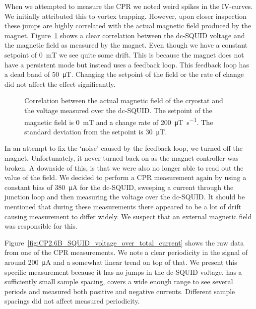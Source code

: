 When we attempted to measure the CPR we noted weird spikes in the IV-curves. We initially attributed this to vortex trapping. However, upon closer inspection these jumps are highly correlated with the actual magnetic field produced by the magnet. Figure~\ref{fig:CP2.6B_PPMS_magnetic_field_drift} shows a clear correlation between the dc-SQUID voltage and the magnetic field as measured by the magnet. Even though we have a constant setpoint of \qty{0}{\milli\tesla} we see quite some drift. This is because the magnet does not have a persistent mode but instead uses a feedback loop. This feedback loop has a dead band of \qty{50}{\micro\tesla}. Changing the setpoint of the field or the rate of change did not affect the effect significantly.

\begin{figure}[ht!]
	\centering
	
	\caption{Correlation between the actual magnetic field of the cryostat and the voltage measured over the dc-SQUID. The setpoint of the magnetic field is \qty{0}{\milli\tesla} and a change rate of \qty{200}{\micro\tesla\per\second}. The standard deviation from the setpoint is \qty{30}{\micro\tesla}.}
	\label{fig:CP2.6B_PPMS_magnetic_field_drift}
\end{figure}

In an attempt to fix the `noise' caused by the feedback loop, we turned off the magnet. Unfortunately, it never turned back on as the magnet controller was broken. A downside of this, is that we were also no longer able to read out the value of the field. We decided to perform a CPR measurement again by using a constant bias of \qty{380}{\micro\ampere} for the dc-SQUID, sweeping a current through the junction loop and then measuring the voltage over the dc-SQUID. It should be mentioned that during these measurements there appeared to be a lot of drift causing measurement to differ widely. We suspect that an external magnetic field was responsible for this. 

Figure~\ref{fig:CP2.6B_SQUID_voltage_over_total_current} shows the raw data from one of the CPR measurements. We note a clear periodicity in the signal of around \qty{200}{\micro\ampere} and a somewhat linear trend on top of that. We present this specific measurement because it has no jumps in the dc-SQUID voltage, has a sufficiently small sample spacing, covers a wide enough range to see several periods and measured both positive and negative currents. Different sample spacings did not affect measured periodicity.

